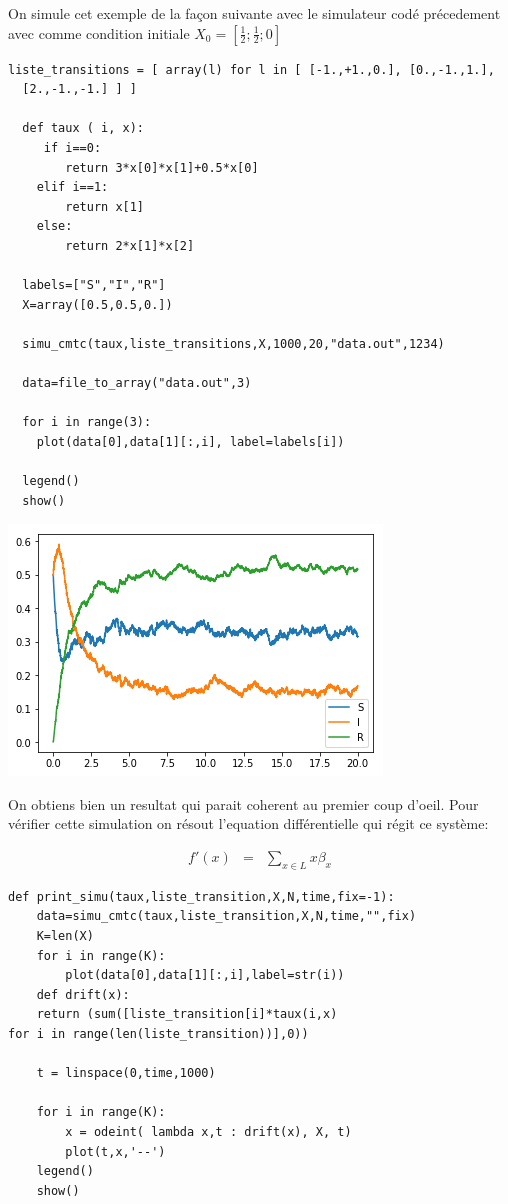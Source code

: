 \documentclass[a4paper]{article}
\begin{document}
On simule cet exemple de la façon suivante avec le simulateur codé
précedement avec comme condition initiale $X_0=[\frac{1}{2};\frac{1}{2};0]$ \\

\begin{lstlisting}[frame=single]
  liste_transitions = [ array(l) for l in [ [-1.,+1.,0.], [0.,-1.,1.],
  [2.,-1.,-1.] ] ]

  def taux ( i, x):
     if i==0:
        return 3*x[0]*x[1]+0.5*x[0]
    elif i==1:
        return x[1]
    else:
        return 2*x[1]*x[2]
    
  labels=["S","I","R"]
  X=array([0.5,0.5,0.])

  simu_cmtc(taux,liste_transitions,X,1000,20,"data.out",1234)

  data=file_to_array("data.out",3)

  for i in range(3):
    plot(data[0],data[1][:,i], label=labels[i])

  legend()
  show()
\end{lstlisting}
\includegraphics{figure1.png}


On obtiens bien un resultat qui parait coherent au premier coup
d'oeil. Pour vérifier cette simulation on résout l'equation
différentielle qui régit ce système:

\begin{eqnarray*}
  f'(x) &=& \sum_{x \in L}x\beta_x
\end{eqnarray*}

\begin{lstlisting}[frame=single]
  def print_simu(taux,liste_transition,X,N,time,fix=-1):
    data=simu_cmtc(taux,liste_transition,X,N,time,"",fix)
    K=len(X)
    for i in range(K):
        plot(data[0],data[1][:,i],label=str(i))
    def drift(x):
    return (sum([liste_transition[i]*taux(i,x)
for i in range(len(liste_transition))],0))
    
    t = linspace(0,time,1000)

    for i in range(K):
        x = odeint( lambda x,t : drift(x), X, t)
        plot(t,x,'--')
    legend()
    show()
  \end{lstlisting}
\end{document}
